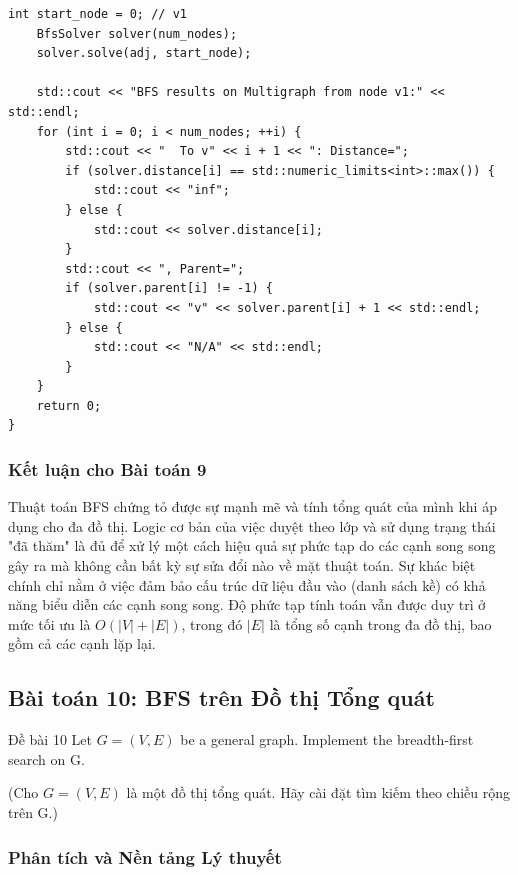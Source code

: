 \documentclass[a4paper,12pt]{article}
\begin{document}
\begin{lstlisting}[style=cppstyle, caption={Cài đặt BFS cho đa đồ thị trong C++.}, label={lst:cpp_bfs_9_full}]
    int start_node = 0; // v1
    BfsSolver solver(num_nodes);
    solver.solve(adj, start_node);

    std::cout << "BFS results on Multigraph from node v1:" << std::endl;
    for (int i = 0; i < num_nodes; ++i) {
        std::cout << "  To v" << i + 1 << ": Distance=";
        if (solver.distance[i] == std::numeric_limits<int>::max()) {
            std::cout << "inf";
        } else {
            std::cout << solver.distance[i];
        }
        std::cout << ", Parent=";
        if (solver.parent[i] != -1) {
            std::cout << "v" << solver.parent[i] + 1 << std::endl;
        } else {
            std::cout << "N/A" << std::endl;
        }
    }
    return 0;
}
\end{lstlisting}

\subsubsection{Kết luận cho Bài toán 9}
Thuật toán BFS chứng tỏ được sự mạnh mẽ và tính tổng quát của mình khi áp dụng cho đa đồ thị. Logic cơ bản của việc duyệt theo lớp và sử dụng trạng thái "đã thăm" là đủ để xử lý một cách hiệu quả sự phức tạp do các cạnh song song gây ra mà không cần bất kỳ sự sửa đổi nào về mặt thuật toán. Sự khác biệt chính chỉ nằm ở việc đảm bảo cấu trúc dữ liệu đầu vào (danh sách kề) có khả năng biểu diễn các cạnh song song. Độ phức tạp tính toán vẫn được duy trì ở mức tối ưu là $O(|V| + |E|)$, trong đó $|E|$ là tổng số cạnh trong đa đồ thị, bao gồm cả các cạnh lặp lại.


\subsection{Bài toán 10: BFS trên Đồ thị Tổng quát}
\begin{problembox}{Đề bài 10}
    Let $G = (V,E)$ be a general graph. Implement the breadth-first search on G.
    
    (Cho $G = (V,E)$ là một đồ thị tổng quát. Hãy cài đặt tìm kiếm theo chiều rộng trên G.)
\end{problembox}

\subsubsection{Phân tích và Nền tảng Lý thuyết}
\end{document}

